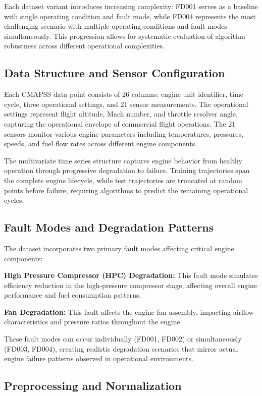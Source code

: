 \documentclass[11pt]{article}
\begin{document}
Each dataset variant introduces increasing complexity: FD001 serves as a baseline with single operating condition and fault mode, while FD004 represents the most challenging scenario with multiple operating conditions and fault modes simultaneously. This progression allows for systematic evaluation of algorithm robustness across different operational complexities.

\subsection{Data Structure and Sensor Configuration}

Each CMAPSS data point consists of 26 columns: engine unit identifier, time cycle, three operational settings, and 21 sensor measurements. The operational settings represent flight altitude, Mach number, and throttle resolver angle, capturing the operational envelope of commercial flight operations. The 21 sensors monitor various engine parameters including temperatures, pressures, speeds, and fuel flow rates across different engine components.

The multivariate time series structure captures engine behavior from healthy operation through progressive degradation to failure. Training trajectories span the complete engine lifecycle, while test trajectories are truncated at random points before failure, requiring algorithms to predict the remaining operational cycles.

\subsection{Fault Modes and Degradation Patterns}

The dataset incorporates two primary fault modes affecting critical engine components:

\textbf{High Pressure Compressor (HPC) Degradation:} This fault mode simulates efficiency reduction in the high-pressure compressor stage, affecting overall engine performance and fuel consumption patterns.

\textbf{Fan Degradation:} This fault affects the engine fan assembly, impacting airflow characteristics and pressure ratios throughout the engine.

These fault modes can occur individually (FD001, FD002) or simultaneously (FD003, FD004), creating realistic degradation scenarios that mirror actual engine failure patterns observed in operational environments.

\subsection{Preprocessing and Normalization}
\end{document}
